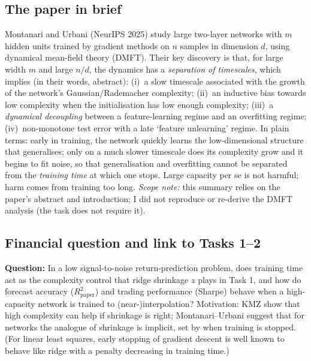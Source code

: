 \documentclass[11pt,a4paper]{article}
\newcommand{\Rpaper}{R^2_{\mathrm{paper}}}
\begin{document}
\subsection{The paper in brief}
Montanari and Urbani (NeurIPS 2025) study large two-layer networks with $m$ hidden units trained by gradient methods on $n$ samples in dimension $d$, using dynamical mean-field theory (DMFT).
Their key discovery is that, for large width $m$ and large $n/d$, the dynamics has a \emph{separation of timescales}, which implies (in their words, abstract): (i)~a slow timescale associated with the growth of the network's Gaussian/Rademacher complexity; (ii)~an inductive bias towards low complexity when the initialisation has low enough complexity;
(iii)~a \emph{dynamical decoupling} between a feature-learning regime and an overfitting regime; (iv)~non-monotone test error with a late `feature unlearning' regime. In plain terms: early in training, the network quickly learns the low-dimensional structure that generalises; only on a much slower timescale does its complexity grow
and it begins to fit noise, so that generalisation and overfitting cannot be separated from the \emph{training time} at which one stops. Large capacity per se is not harmful; harm comes from training too long.
\emph{Scope note:} this summary relies on the paper's abstract and introduction; I did not reproduce or re-derive the DMFT analysis (the task does not require it).

\subsection{Financial question and link to Tasks 1--2}
\textbf{Question:} In a low signal-to-noise return-prediction problem, does training time act as the complexity control that ridge shrinkage $z$ plays in Task 1, and how do forecast accuracy ($\Rpaper$) and trading performance (Sharpe) behave when a high-capacity network is trained to (near-)interpolation?
Motivation: KMZ show that high complexity can help if shrinkage is right; Montanari--Urbani suggest that for networks the analogue of shrinkage is implicit, set by when training is stopped. (For linear least squares, early stopping of gradient descent is well known to behave like ridge with a penalty decreasing in training time.)
\end{document}
